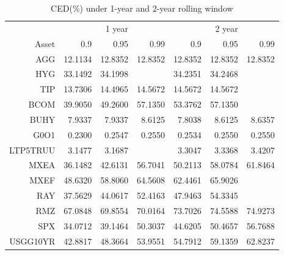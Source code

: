 \documentclass[12pt]{article}
\begin{document}
\begin{table}[!h]
\caption{CED(\%) under 1-year and 2-year rolling window} %
\centering 
\begin{tabular}{ | r || r r r || r r r |} 
 \hline
 & & 1 year & & & 2 year & \\
Asset& 0.9 & 0.95 & 0.99 & 0.9 & 0.95 & 0.99  \\
  \hline \hline
AGG & 12.1134 & 12.8352 & 12.8352 & 12.8352 & 12.8352 & 12.8352\\ 
HYG & 33.1492 & 34.1998 &      & 34.2351 & 34.2468 &       \\ 
TIP & 13.7306 & 14.4965 & 14.5672 & 14.5672 & 14.5672 &       \\ 
BCOM & 39.9050 & 49.2600 & 57.1350 & 53.3762 & 57.1350 &       \\ 
BUHY &  7.9337 &  7.9337 &  8.6125 &  7.8038 &  8.6125 &  8.6357\\ 
G0O1 &  0.2300 &  0.2547 &  0.2550 &  0.2534 &  0.2550 &  0.2550\\ 
LTP5TRUU &  3.1477 &  3.1687 &       &  3.3047 &  3.3368 &  3.4207\\ 
MXEA & 36.1482 & 42.6131 & 56.7041 & 50.2113 & 58.0784 & 61.8464\\ 
MXEF & 48.6320 & 58.8060 & 64.5608 & 62.4461 & 65.9026 &       \\ 
RAY & 37.5629 & 44.0617 & 52.4163 & 47.9463 & 54.3345 &       \\ 
RMZ & 67.0848 & 69.8554 & 70.0164 & 73.7026 & 74.5588 & 74.9273\\ 
SPX & 34.0712 & 39.1464 & 50.3037 & 44.6205 & 50.4657 & 56.7688\\ 
USGG10YR & 42.8817 & 48.3664 & 53.9551 & 54.7912 & 59.1359 & 62.8237\\
 \hline
\end{tabular}
\label{table:CED3}
\end{table}
\end{document}
